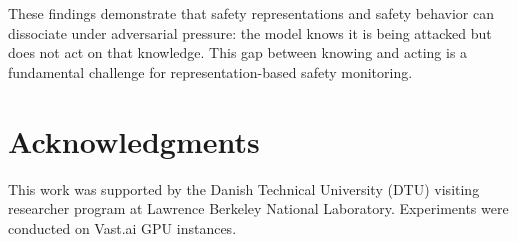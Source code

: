 \documentclass[11pt]{article}
\begin{document}
These findings demonstrate that safety representations and safety behavior can dissociate under adversarial pressure: the model knows it is being attacked but does not act on that knowledge.
This gap between knowing and acting is a fundamental challenge for representation-based safety monitoring.

\section*{Acknowledgments}
This work was supported by the Danish Technical University (DTU) visiting researcher program at Lawrence Berkeley National Laboratory.
Experiments were conducted on Vast.ai GPU instances.



\end{document}
